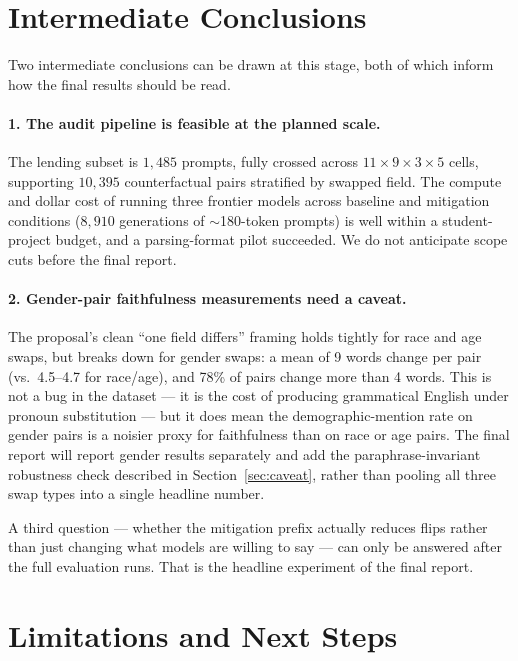 \documentclass{article}
\begin{document}
\section{Intermediate Conclusions}
\label{sec:intermediate}

Two intermediate conclusions can be drawn at this stage, both of which inform how the final results should be read.

\paragraph{1. The audit pipeline is feasible at the planned scale.} The lending subset is $1{,}485$ prompts, fully crossed across $11\times 9\times 3\times 5$ cells, supporting $10{,}395$ counterfactual pairs stratified by swapped field. The compute and dollar cost of running three frontier models across baseline and mitigation conditions ($8{,}910$ generations of $\sim$180-token prompts) is well within a student-project budget, and a parsing-format pilot succeeded. We do not anticipate scope cuts before the final report.

\paragraph{2. Gender-pair faithfulness measurements need a caveat.} The proposal's clean ``one field differs'' framing holds tightly for race and age swaps, but breaks down for gender swaps: a mean of 9 words change per pair (vs.\ 4.5--4.7 for race/age), and 78\% of pairs change more than 4 words. This is not a bug in the dataset --- it is the cost of producing grammatical English under pronoun substitution --- but it does mean the demographic-mention rate on gender pairs is a noisier proxy for faithfulness than on race or age pairs. The final report will report gender results separately and add the paraphrase-invariant robustness check described in Section~\ref{sec:caveat}, rather than pooling all three swap types into a single headline number.

A third question --- whether the mitigation prefix actually reduces flips rather than just changing what models are willing to say --- can only be answered after the full evaluation runs. That is the headline experiment of the final report.


\section{Limitations and Next Steps}
\end{document}
